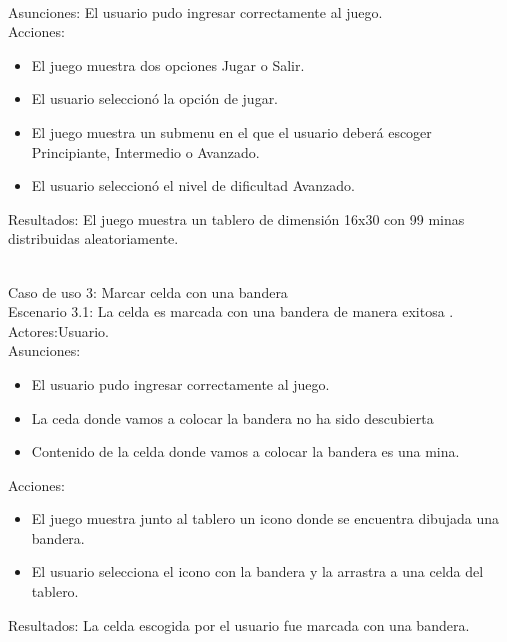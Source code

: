 \documentclass[11pt]{article} %
\begin{document}
\\Asunciones: El usuario pudo ingresar correctamente al juego.\
\\Acciones:\
\begin{itemize}
\item El juego muestra dos opciones Jugar o Salir.
\item El usuario seleccionó la opción de jugar.
\item El juego muestra un submenu en el que el usuario deberá escoger Principiante, Intermedio o Avanzado.
\item El usuario seleccionó el nivel de dificultad Avanzado.
\end {itemize}
Resultados:
El juego muestra un tablero de dimensión 16x30 con 99 minas distribuidas aleatoriamente.
\\ \

Caso de uso 3: Marcar celda con una bandera
\\Escenario 3.1: La celda es marcada  con una bandera de manera exitosa .\
\\Actores:Usuario.\
\\Asunciones: 
\begin{itemize}
\item El usuario pudo ingresar correctamente al juego.
\item La ceda donde vamos a colocar la bandera no ha sido descubierta
\item Contenido de la celda donde vamos a colocar la bandera es una mina.
\end {itemize}
Acciones:
\begin{itemize}
\item El juego muestra junto al tablero un icono donde se encuentra dibujada una bandera.
\item El usuario selecciona el icono con la bandera y la arrastra a una celda del tablero. 
\end {itemize}
Resultados:
La celda escogida por el usuario fue marcada con una bandera.
\end{document}
